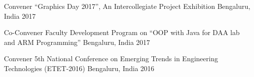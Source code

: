 



\begin{cvhonors}

  \cvhonor
    {Convener} %
    {“Graphics Day 2017”, An Intercollegiate Project Exhibition} %
    {Bengaluru, India} %
    {2017} %

  \cvhonor
    {Co-Convener} %
    {Faculty Development Program on “OOP with Java for DAA lab and ARM Programming”} %
    {Bengaluru, India} %
    {2017} %

  \cvhonor
    {Convener} %
    {5th National Conference on Emerging Trends in Engineering Technologies (ETET-2016)} %
    {Bengaluru, India} %
    {2016} %


\end{cvhonors}




